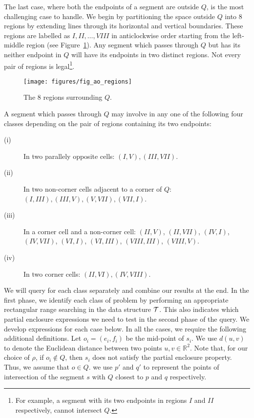 The last case, where both the endpoints of a segment are outside $Q$, 
is the most challenging case to handle. We begin by partitioning the 
space outside $Q$ into 8 regions by extending lines through its 
horizontal and vertical boundaries. These regions are labelled as 
$I, II, \ldots, VIII$ in anticlockwise order starting from the 
left-middle region (see Figure~\ref{fig:rectangles:ao:regions}). Any 
segment which passes through $Q$ but has its neither endpoint in $Q$ 
will have its endpoints in two distinct regions. Not every pair of 
regions is legal\footnote{For example, a segment with its two endpoints 
in regions $I$ and $II$ respectively, cannot intersect $Q$.}.

\begin{figure}[t]
\begin{center}
  \texttt{[image: figures/fig\_ao\_regions]}
  \caption{The 8 regions surrounding $Q$.}
  \label{fig:rectangles:ao:regions}
\end{center}
\end{figure}

A segment which passes through $Q$ may involve in any one of the following 
four classes depending on the pair of regions containing its two endpoints:

\begin{description}
\item[(i)] In two parallely opposite cells: $(I, V), (III, VII)$.
\item[(ii)] In two non-corner cells adjacent to a corner of $Q$: $(I, III), 
(III, V), (V,VII), (VII, I)$.
\item[(iii)] In a corner cell and a non-corner cell: $(II, V)$, $(II, VII)$, 
$(IV, I)$, 
$(IV, VII)$, $(VI, I)$, \newline $(VI, III)$, $(VIII, III)$, $(VIII, V)$.
\item[(iv)] In two corner cells: $(II, VI), (IV, VIII)$.
\end{description}

We will query for each class separately and combine our results at the end. 
In the first phase, we identify each class of problem 
by performing an appropriate rectangular range searching in the 
data structure $\cal T$. 
This also indicates which partial enclosure expressions we need to test in 
the second phase of the query. We develop expressions for each case below. 
In all the cases, we require the following additional definitions. Let 
$o_i = (e_i, f_i)$ be the mid-point of $s_i$. We use  
$d(u,v)$ to denote the Euclidean distance between two points $u,v \in 
\mathbb{R}^2$. Note that, for our choice of $\rho$, if $o_i \not\in Q$, 
then $s_i$ does not satisfy the partial enclosure property. Thus, we assume 
that 
$o \in Q$. we use $p'$ and $q'$ to represent the points of intersection of the 
segment 
$s$ with $Q$ closest to $p$ and $q$ respectively.

